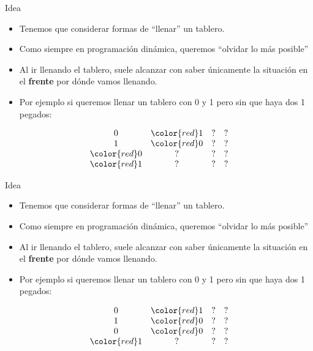 \documentclass{beamer}
\begin{document}
\begin{frame}{Idea}
    \begin{itemize}
		\item Tenemos que considerar formas de ``llenar'' un tablero.
		\item Como siempre en programación dinámica, queremos ``olvidar lo más posible''
		\item Al ir llenando el tablero, suele alcanzar con saber únicamente la situación en el \textbf{frente} por dónde vamos llenando.
		\item Por ejemplo si queremos llenar un tablero con 0 y 1 pero sin que haya dos 1 pegados:
    \end{itemize}
    $$\begin{array}{cccc}
		0 & \color{red}1 & ? & ? \\
		1 & \color{red}0 & ? & ? \\
		\color{red}0 & ? & ? & ? \\
		\color{red}1 & ? & ? & ? \\
    \end{array}$$
\end{frame}

\begin{frame}{Idea}
    \begin{itemize}
		\item Tenemos que considerar formas de ``llenar'' un tablero.
		\item Como siempre en programación dinámica, queremos ``olvidar lo más posible''
		\item Al ir llenando el tablero, suele alcanzar con saber únicamente la situación en el \textbf{frente} por dónde vamos llenando.
		\item Por ejemplo si queremos llenar un tablero con 0 y 1 pero sin que haya dos 1 pegados:
    \end{itemize}
    $$\begin{array}{cccc}
		0 & \color{red}1 & ? & ? \\
		1 & \color{red}0 & ? & ? \\
		0 & \color{red}0 & ? & ? \\
		\color{red}1 & ? & ? & ? \\
    \end{array}$$
\end{frame}
\end{document}
